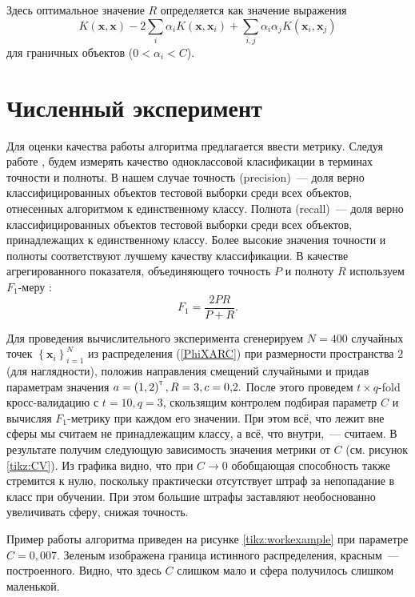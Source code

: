 \documentclass[12pt,a4paper]{article}
\newcommand\mb[1]{\ensuremath{\boldsymbol{\mathbf{#1}}}}
\newcommand{\suml}{\sum\limits}
\newcommand\cbr[1]{\left(#1\right)} %
\newcommand\fbr[1]{\left\{#1\right\}} %
\newcommand{\T}{^{\text{\tiny\sffamily\upshape\mdseries T}}}
\begin{document}
	Здесь оптимальное значение $R$ определяется как значение выражения $$K(\mb x,\mb x) - 2\suml_{i} \alpha_i K(\mb x, \mb x_i) + \suml_{i,j} \alpha_i\alpha_jK(\mb x_i,\mb x_j)$$ для граничных объектов ($0<\alpha_i<C$).

\section{Численный эксперимент} 		 	
	Для оценки качества работы алгоритма предлагается ввести метрику. 
	Следуя работе  \cite{Romanenko2012}, будем измерять качество одноклассовой класификации в терминах точности и полноты. 
	В нашем случае точность (precision)~--- доля верно классифицированных объектов тестовой выборки среди всех объектов, отнесенных алгоритмом к единственному классу. 
	Полнота (recall)~--- доля верно классифицированных объектов тестовой выборки среди всех объектов, принадлежащих к единственному классу. 
	Более высокие значения точности и полноты соответствуют лучшему качеству классификации. 
	В качестве агрегированного показателя, объединяющего точность $P$ и полноту $R$ используем $F_1$-меру \cite{Rijsbergen1979}:
	$$F_1 = \frac{2PR}{P+R}.$$

	Для проведения вычислительного эксперимента сгенерируем $N=400$ случайных точек $\fbr{\mb x_i}_{i=1}^N$ из распределения (\ref{PhiXARC}) при размерности пространства $2$ (для наглядности), положив направления смещений случайными и придав параметрам значения $a = \cbr{1,2}\T, R = 3, c = 0{,}2.$
	После этого проведем $t{\times}q$-fold кросс-валидацию с $t = 10, q = 3$, скользящим контролем подбирая параметр $C$ и вычисляя $F_1$-метрику при каждом его значении. При этом всё, что лежит вне сферы мы считаем не принадлежащим классу, а всё, что внутри,~--- считаем.
	В результате получим следующую зависимость значения метрики от $C$ (см. рисунок \ref{tikz:CV}).
	Из графика видно, что при $C\to 0$ обобщающая способность также стремится к нулю, поскольку практически отсутствует штраф за непопадание в класс при обучении. 
	При этом большие штрафы заставляют необоснованно увеличивать сферу, снижая точность.

	Пример работы алгоритма приведен на рисунке \ref{tikz:workexample} при параметре $C = 0{,}007.$ 
	Зеленым изображена граница истинного распределения, красным~--- построенного.
	Видно, что здесь $C$ слишком мало и сфера получилось слишком маленькой.
	
\end{document}
